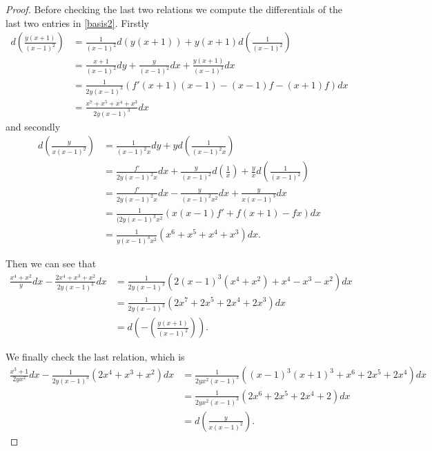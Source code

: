 \documentclass[draft, 11pt]{article} %
\theoremstyle{plain}
\theoremstyle{remark}
\begin{document}
\begin{proof}
Before checking the last two relations we compute the differentials of the last two entries in \eqref{basis2}.
Firstly
\begin{align}
d \left(  \frac{y(x+1)}{(x-1)^2} \right) & = \frac{1}{(x-1)^2}d(y(x+1)) + y(x+1)d \left( \frac{1}{(x-1)^2} \right) \\
& = \frac{x+1}{(x-1)^2} dy + \frac{y}{(x-1)^2}dx + \frac{y(x+1)}{(x-1)^3} dx \\
& = \frac{1}{2y(x-1)^3} ( f'(x+1)(x-1) - (x-1)f - (x+1)f)dx \\
& = \frac{x^7 + x^5 + x^4 + x^3}{2y(x-1)^3}dx
\end{align}
and secondly
\begin{align}
d \left( \frac{y}{x(x-1)^2} \right) & = \frac{1}{(x-1)^2x}dy + yd\left( \frac{1}{(x-1)^2x} \right) \\
& = \frac{f'}{2y(x-1)^2x}dx + \frac{y}{(x-1)^2}d \left( \frac{1}{x} \right) + \frac{y}{x} d \left( \frac{1}{(x-1)^2} \right) \\
& = \frac{f'}{2y(x-1)^2x}dx - \frac{y}{(x-1)^2x^2}dx + \frac{y}{x(x-1)^3} dx \\
& = \frac{1}{(2y(x-1)^3x^2}(x(x-1)f' + f(x+1) - fx) dx \\
& = \frac{1}{y(x-1)^3x^2}(x^6 + x^5 + x^4 + x^3)dx.
\end{align}

Then we can see that
\begin{align}
\frac{x^4 + x^2}{y}dx - \frac{2x^4 + x^3 + x^2}{2y(x-1)^3}dx & = \frac{1}{2y(x-1)^3}(2(x-1)^3(x^4+ x^2) + x^4-x^3 - x^2)dx \\
& = \frac{1}{2y(x-1)^3}(2x^7 + 2x^5 + 2x^4 + 2x^3)dx \\
& = d \left(-\left( \frac{y(x+1)}{(x-1)^2} \right) \right).
\end{align}

We finally check the last relation, which is
\begin{align}
\frac{x^3+1}{2yx^2}dx - \frac{1}{2y(x-1)^3}(2x^4 + x^3 + x^2)dx & = \frac{1}{2yx^2(x-1)^3}((x-1)^3(x+1)^3 + x^6 + 2x^5 + 2x^4) dx \\
& = \frac{1}{2yx^2(x-1)^3}(2x^6 + 2x^5 + 2x^4 +2)dx \\
& = d\left(\frac{y}{x(x-1)^2} \right).
\end{align}

\end{proof}
\end{document}
